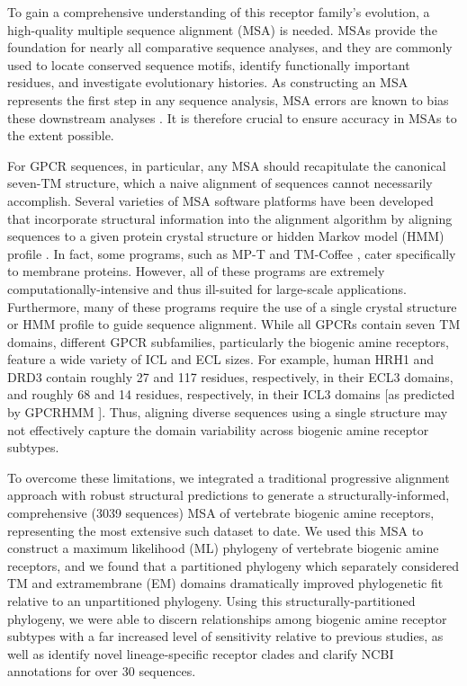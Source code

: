 \documentclass[fleqn,10pt]{wlpeerj}
\begin{document}
To gain a comprehensive understanding of this receptor family's evolution, a high-quality multiple sequence alignment (MSA) is needed. MSAs provide the foundation for nearly all comparative sequence analyses, and they are commonly used to locate conserved sequence motifs, identify functionally important residues, and investigate evolutionary histories. As constructing an MSA represents the first step in any sequence analysis, MSA errors are known to bias these downstream analyses \citep{Ogden2006, Wong2008, Jordan2012}. It is therefore crucial to ensure accuracy in MSAs to the extent possible. 

For GPCR sequences, in particular, any MSA should recapitulate the canonical seven-TM structure, which a naive alignment of sequences cannot necessarily accomplish. Several varieties of MSA software platforms have been developed that incorporate structural information into the alignment algorithm by aligning sequences to a given protein crystal structure \citep{promals3d, 3dcoffee} or hidden Markov model (HMM) profile \citep{hmmer, Chang2012, Hill2012}. In fact, some programs, such as MP-T \citep{Hill2012} and TM-Coffee \citep{Chang2012}, cater specifically to membrane proteins. However, all of these programs are extremely computationally-intensive and thus ill-suited for large-scale applications. Furthermore, many of these programs require the use of a single crystal structure or HMM profile to guide sequence alignment. While all GPCRs contain seven TM domains, different GPCR subfamilies, particularly the biogenic amine receptors, feature a wide variety of ICL and ECL sizes. For example, human HRH1 and DRD3 contain roughly 27 and 117 residues, respectively, in their ECL3 domains, and roughly 68 and 14 residues, respectively, in their ICL3 domains [as predicted by GPCRHMM \citep{Wistrand2006}]. Thus, aligning diverse sequences using a single structure may not effectively capture the domain variability across biogenic amine receptor subtypes. 

To overcome these limitations, we integrated a traditional progressive alignment approach with robust structural predictions to generate a structurally-informed, comprehensive (3039 sequences) MSA of vertebrate biogenic amine receptors, representing the most extensive such dataset to date. We used this MSA to construct a maximum likelihood (ML) phylogeny of vertebrate biogenic amine receptors, and we found that a partitioned phylogeny which separately considered TM and extramembrane (EM) domains dramatically improved phylogenetic fit relative to an unpartitioned phylogeny. Using this structurally-partitioned phylogeny, we were able to discern relationships among biogenic amine receptor subtypes with a far increased level of sensitivity relative to previous studies, as well as identify novel lineage-specific receptor clades and clarify NCBI annotations for over 30 sequences.
\end{document}
